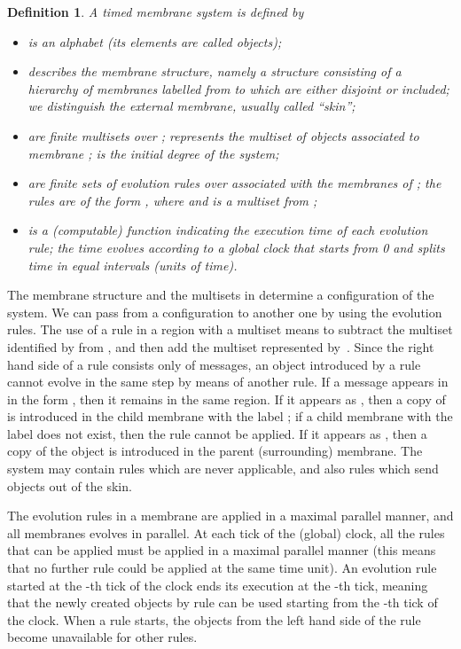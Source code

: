 \documentclass{eptcs}
\newtheorem{definition}{Definition}
\begin{document}
\begin{definition}
\label{definition:timed_symanti} A {\rm timed membrane system}
 is defined by
\begin{itemize}
\item[]  is an alphabet (its elements are called
{\rm objects});

\item[]  describes the {\rm membrane
structure}, namely a structure consisting of a hierarchy of 
membranes labelled from  to  which are either disjoint or
included; we distinguish the external membrane, usually called
``skin'';

\item[]  are finite multisets over ; 
represents the multiset of objects associated to membrane ;  is the initial degree of the system;

\item[]  are finite sets of
evolution rules over  associated with the membranes of ; the
rules are of the form , where  and  is
a multiset from ;

\item  is a
(computable) function indicating the execution time of each
evolution rule; the time evolves according to a global clock that
starts from 0 and splits time in equal intervals (units of time).
\end{itemize}
\end{definition}

The membrane structure and the multisets in  determine a
configuration of the system. We can pass from a configuration to
another one by using the evolution rules. The use of a rule
 in a region with a multiset  means to subtract
the multiset identified by  from , and then add the multiset
represented by~.
Since the right hand side  of a rule consists only of messages,
an object introduced by a rule cannot evolve in the same step by
means of another rule. If a message appears in  in the form
, then it remains in the same region. If it appears as
, then a copy of  is introduced in the child membrane
with the label ; if a child membrane with the label  does not
exist, then the rule cannot be applied. If it appears as ,
then a copy of the object  is introduced in the parent (surrounding)
membrane. The system may contain rules which are never applicable,
and also rules which send objects out of the skin.

The evolution rules in a membrane are applied in a
maximal parallel manner, and all membranes evolves in parallel. At
each tick of the (global) clock, all the rules that can be applied
must be applied in a maximal parallel manner (this means that no
further rule could be applied at the same time unit). An evolution
rule  started at the -th tick of the clock ends its execution
at the -th tick, meaning that the newly created objects by
rule  can be used starting from the -th tick of the
clock. When a rule starts, the objects from the left hand side of
the rule become unavailable for other rules.
\end{document}
